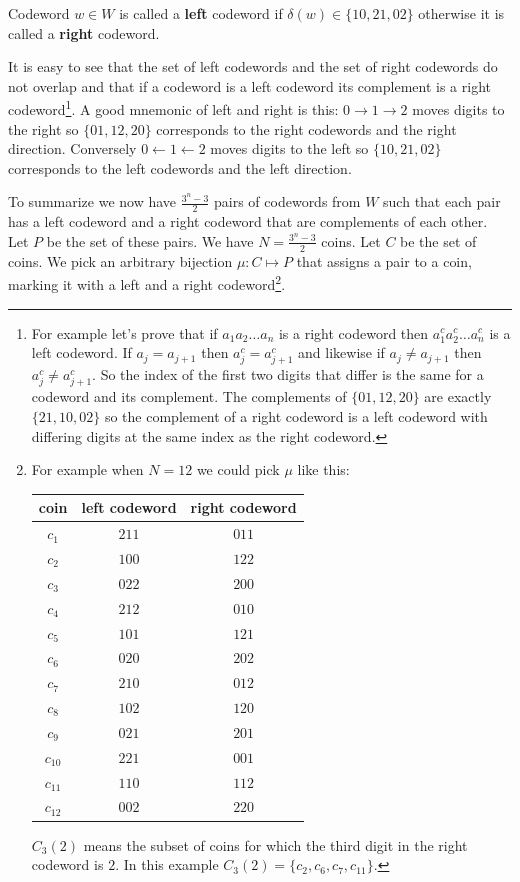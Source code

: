 \begin{defn}
Codeword $w \in W$ is called a \textbf{left} codeword if $\delta(w) \in \{10, 21, 02\}$ otherwise it is called a \textbf{right} codeword. 
\end{defn}
 
It is easy to see that the set of left codewords and the set of right codewords do not overlap and that if a codeword is a left codeword its complement is a right codeword\footnote{For example let's prove that if $a_1 a_2 \ldots a_n$ is a right codeword then $a_1^c a_2^c \ldots a_n^c$ is a left codeword. If $a_j=a_{j+1}$ then $a_j^c=a_{j+1}^c$ and likewise if $a_j \neq a_{j+1}$ then $a_j^c \neq a_{j+1}^c$. So the index of the first two digits that differ is the same for a codeword and its complement. The complements of $\{01, 12, 20\}$ are exactly $\{21, 10, 02\}$ so the complement of a right codeword is a left codeword with differing digits at the same index as the right codeword.}. A good mnemonic of left and right is this: $0 \rightarrow 1 \rightarrow 2$ moves digits to the right so $\{01, 12, 20\}$ corresponds to the right codewords and the right direction. Conversely $0 \leftarrow 1 \leftarrow 2$ moves digits to the left so $\{10, 21, 02\}$ corresponds to the left codewords and the left direction.

To summarize we now have $\frac{3^n - 3}{2}$ pairs of codewords from $W$ such that each pair has a left codeword and a right codeword that are complements of each other. Let $P$ be the set of these pairs. We have $N=\frac{3^n - 3}{2}$ coins. Let $C$ be the set of coins. We pick an arbitrary bijection $\mu: C \mapsto P$ that assigns a pair to a coin, marking it with a left and a right codeword\footnote{For example when $N=12$ we could pick $\mu$ like this:
\begin{center}
\begin{tabular}{ |c|c|c| } 
 \hline
 coin & left codeword & right codeword \\
 \hline
 $c_1$ & $211$ & $011$ \\
 $c_2$ & $100$ & $122$ \\  
 $c_3$ & $022$ & $200$ \\
 $c_4$ & $212$ & $010$ \\
 $c_5$ & $101$ & $121$ \\
 $c_6$ & $020$ & $202$ \\
 $c_7$ & $210$ & $012$ \\
 $c_8$ & $102$ & $120$ \\
 $c_9$ & $021$ & $201$ \\
 $c_{10}$ & $221$ & $001$ \\
 $c_{11}$ & $110$ & $112$ \\
 $c_{12}$ & $002$ & $220$ \\
 \hline
\end{tabular}
\end{center}
$C_3(2)$ means the subset of coins for which the third digit in the right codeword is $2$. In this example $C_3(2) = \{c_2, c_6, c_7, c_{11}\}$.}.

